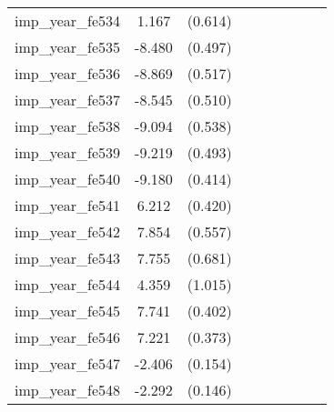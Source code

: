 {\begin{tabular}{l*{4}{cc}}
imp\_year\_fe534&    1.167         &  (0.614)&                  &         &                  &         &                  &         \\
imp\_year\_fe535&   -8.480\sym{***}&  (0.497)&                  &         &                  &         &                  &         \\
imp\_year\_fe536&   -8.869\sym{***}&  (0.517)&                  &         &                  &         &                  &         \\
imp\_year\_fe537&   -8.545\sym{***}&  (0.510)&                  &         &                  &         &                  &         \\
imp\_year\_fe538&   -9.094\sym{***}&  (0.538)&                  &         &                  &         &                  &         \\
imp\_year\_fe539&   -9.219\sym{***}&  (0.493)&                  &         &                  &         &                  &         \\
imp\_year\_fe540&   -9.180\sym{***}&  (0.414)&                  &         &                  &         &                  &         \\
imp\_year\_fe541&    6.212\sym{***}&  (0.420)&                  &         &                  &         &                  &         \\
imp\_year\_fe542&    7.854\sym{***}&  (0.557)&                  &         &                  &         &                  &         \\
imp\_year\_fe543&    7.755\sym{***}&  (0.681)&                  &         &                  &         &                  &         \\
imp\_year\_fe544&    4.359\sym{***}&  (1.015)&                  &         &                  &         &                  &         \\
imp\_year\_fe545&    7.741\sym{***}&  (0.402)&                  &         &                  &         &                  &         \\
imp\_year\_fe546&    7.221\sym{***}&  (0.373)&                  &         &                  &         &                  &         \\
imp\_year\_fe547&   -2.406\sym{***}&  (0.154)&                  &         &                  &         &                  &         \\
imp\_year\_fe548&   -2.292\sym{***}&  (0.146)&                  &         &                  &         &                  &         \\

\end{tabular}}

